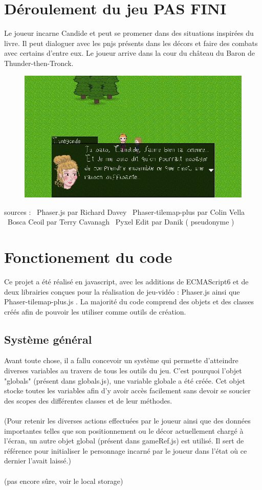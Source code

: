 \documentclass[11pt]{article}
\begin{document}
\section{Déroulement du jeu PAS FINI}
Le joueur incarne Candide et peut se promener dans des situations inspirées du livre. Il peut dialoguer avec les pnjs présents dans les décors et faire des combats avec certains d'entre eux. Le joueur arrive dans la cour du château du Baron de Thunder-then-Tronck. 
\begin{figure}[h]
\includegraphics[scale=0.33]{cunegondeScn}
\centering
\end{figure}
sources : \
Phaser.js par Richard Davey \
Phaser-tilemap-plus par Colin Vella \
Bosca Ceoil par Terry Cavanagh \
Pyxel Edit par Danik ( pseudonyme )\


\section{Fonctionement du code}
Ce projet a été réalisé en javascript, avec les additions de ECMAScript6 et de deux librairies conçues pour la réalisation de jeu-vidéo : Phaser.js ainsi que Phaser-tilemap-plus.js . La majorité du code comprend des objets et des classes créés afin de pouvoir les utiliser comme outils de création.
\subsection{Système général}
	Avant toute chose, il a fallu concevoir un système qui permette d'atteindre diverses variables au travers de tous les outils du jeu. C'est pourquoi l'objet "globals" (présent dans globals.js), une variable globale a été créée. Cet objet stocke toutes les variables afin d'y avoir accès facilement sans devoir se soucier des scopes des différentes classes et de leur méthodes.\\\\
	(Pour retenir les diverses actions effectuées par le joueur ainsi que des données importantes telles que son positionnement ou le décor actuellement chargé à l'écran, un autre objet global (présent dans gameRef.js) est utilisé. Il sert de référence pour initialiser le personnage incarné par le joueur dans l'état où ce dernier l'avait laissé.)\\\\ (pas encore sûre, voir le local storage)
 
\end{document}
